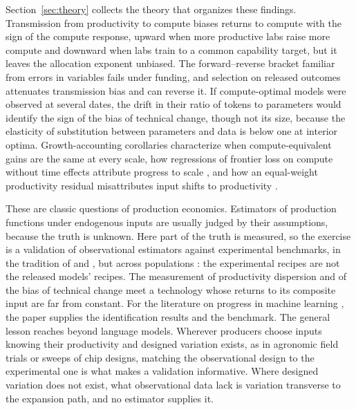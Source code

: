 \documentclass[AER,finalmode]{AEA}
\theoremstyle{definition}
\theoremstyle{remark}
\begin{document}
Section~\ref{sec:theory} collects the theory that organizes these findings. Transmission from productivity to compute
biases returns to compute with the sign of the compute response, upward when more productive labs raise more compute
and downward when labs train to a common capability target, but it leaves the allocation exponent unbiased. The
forward--reverse bracket familiar from errors in variables \citep{klepper1984consistent} fails under funding, and
selection on released outcomes attenuates transmission bias and can reverse it. If compute-optimal models were observed
at several dates, the drift in their ratio of tokens to parameters would identify the sign of the bias of technical
change, though not its size, because the elasticity of substitution between parameters and data is below one at
interior optima. Growth-accounting corollaries characterize when compute-equivalent gains are the same at every scale,
how regressions of frontier loss on compute without time effects attribute progress to scale \citep{nagy2013statistical},
and how an equal-weight productivity residual misattributes input shifts to productivity \citep{hall1988relation}.

These are classic questions of production economics. Estimators of production functions under endogenous inputs
\citep{olley1996dynamics,levinsohn2003estimating,ackerberg2015identification,gandhi2020identification} are usually
judged by their assumptions, because the truth is unknown. Here part of the truth is measured, so the exercise is a
validation of observational estimators against experimental benchmarks, in the tradition of
\citet{lalonde1986evaluating} and \citet{dehejia1999causal}, but across populations
\citep{hotz2005predicting,todd2006assessing}: the experimental recipes are not the released models' recipes. The
measurement of productivity dispersion \citep{syverson2004product,syverson2011determines} and of the bias of technical
change \citep{diamond1978measurement,leonledesma2010identifying} meet a technology whose returns to its composite input
are far from constant. For the literature on progress in machine learning
\citep{erdil2022algorithmic,sevilla2022compute,ho2024algorithmic,gundlach2025origin,whitfill2025note}, the paper
supplies the identification results and the benchmark. The general lesson reaches beyond language models. Wherever
producers choose inputs knowing their productivity and designed variation exists, as in agronomic field trials or
sweeps of chip designs, matching the observational design to the experimental one is what makes a validation
informative. Where designed variation does not exist, what observational data lack is variation transverse to the
expansion path, and no estimator supplies it.
\end{document}
